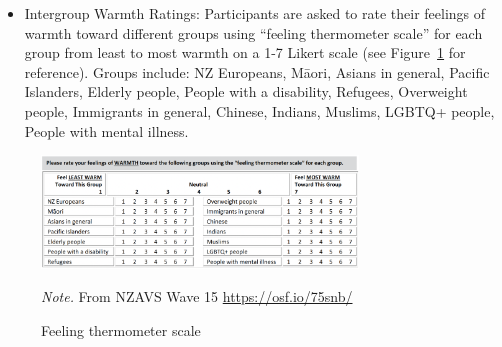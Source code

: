 \documentclass[
  man,
  longtable,
  nolmodern,
  notxfonts,
  notimes,
  colorlinks=true,linkcolor=blue,citecolor=blue,urlcolor=blue]{apa7}
\begin{document}
\begin{itemize}
  \begin{enumerate}
  \def\labelenumi{\arabic{enumi}.}
  \item
    I feel that I am often discriminated against because of my
    religious/spiritual beliefs. (Strongly Disagree 1-7 Strongly Agree)
  \item
    People from my ethnic group are discriminated against in New
    Zealand. (Strongly Disagree 1-7 Strongly Agree)
  \item
    I feel that I am often discriminated against because of my age.
    (Strongly Disagree 1-7 Strongly Agree)
  \item
    I feel that I am often discriminated against because of my
    ethnicity. (Very Innacurate 1-7 Very Accurate)
  \item
    I feel that I am often discriminated against because of my gender.
    (Very Innacurate 1-7 Very Accurate)
  \end{enumerate}
\item
  Intergroup Warmth Ratings: Participants are asked to rate their
  feelings of warmth toward different groups using ``feeling thermometer
  scale'' for each group from least to most warmth on a 1-7 Likert scale
  (see Figure~\ref{fig-warmth} for reference). Groups include: NZ
  Europeans, Māori, Asians in general, Pacific Islanders, Elderly
  people, People with a disability, Refugees, Overweight people,
  Immigrants in general, Chinese, Indians, Muslims, LGBTQ+ people,
  People with mental illness.
\end{itemize}

\begin{figure}[!htbp]

{\caption{{Feeling thermometer scale}{\label{fig-warmth}}}}

\includegraphics[width=0.75\textwidth,height=\textheight]{figs/warmth.png}

{\noindent \emph{Note.} From NZAVS Wave 15 \url{https://osf.io/75snb/}}

\end{figure}
\end{document}
